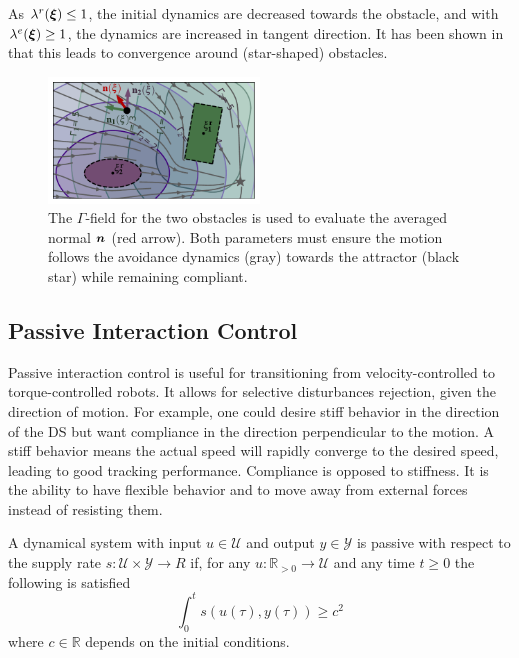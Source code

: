 As $\lambda^r(\boldsymbol{\xi}) \leq 1$, the initial dynamics are decreased towards the obstacle, and with $\lambda^e(\boldsymbol{\xi}) \geq 1$, the dynamics are increased in tangent direction. It has been shown in \cite{huber2022avoiding} that this leads to convergence around (star-shaped) obstacles.

\begin{figure}
\centerline{\includegraphics[width=0.5\textwidth]{figures/normal_and_gamma_field_visualization_annotated.pdf}}
\caption{The $\Gamma$-field for the two obstacles is used to evaluate the averaged normal $\boldsymbol{n}$ (red arrow). 
Both parameters must ensure the motion follows the avoidance dynamics (gray) towards the attractor (black star) while remaining compliant.}
\label{fig:resultant_normal}
\end{figure}

\subsection{Passive Interaction Control} \label{sec:trad_passive}
Passive interaction control \cite{kronander2015passive}is useful for transitioning from velocity-controlled to torque-controlled robots. It allows for selective disturbances rejection, given the direction of motion. For example, one could desire stiff behavior in the direction of the DS but want compliance in the direction perpendicular to the motion.
A stiff behavior means the actual speed will rapidly converge to the desired speed, leading to good tracking performance. Compliance is opposed to stiffness. It is the ability to have flexible behavior and to move away from external forces instead of resisting them.

\begin{definition}
  A dynamical system with input $ u \in \mathcal{U}$ and output $y \in \mathcal{Y}$ is passive with respect to the supply rate $s : \mathcal{U} \times \mathcal{Y} \rightarrow{R}$ if, for any $u: \mathbb{R}_{>0} \rightarrow \mathcal{U}$ and any time $t \geq 0$ the following is satisfied
  \begin{equation}
    \int_0^t s \left( u(\tau),  y (\tau) \right) \geq c^2
  \end{equation}
  where $c \in \mathbb{R}$ depends on the initial conditions.
\end{definition}

